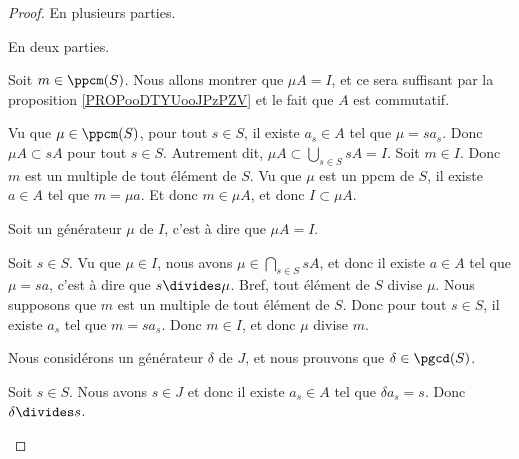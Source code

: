 \begin{proof}
	En plusieurs parties.
	\begin{subproof}
		En deux parties.
		\begin{subproof}
			\spitem[\( \Rightarrow\)]
			Soit \( m\in \ppcm(S)\). Nous allons montrer que \( \mu A=I\), et ce sera suffisant par la proposition \ref{PROPooDTYUooJPzPZV} et le fait que \( A\) est commutatif.
			\begin{subproof}
				\spitem[\( \mu A\subset I\)]
				Vu que \( \mu\in \ppcm(S)\), pour tout \( s\in S\), il existe \( a_s\in A\) tel que \( \mu=s a_s\). Donc \( \mu A\subset sA\) pour tout \( s\in S\). Autrement dit, \( \mu A\subset \bigcup_{s\in S}sA=I\).
				\spitem[\( I\subset \mu A\)]
				Soit \( m\in I\). Donc \( m\) est un multiple de tout élément de \( S\). Vu que \( \mu\) est un ppcm de \( S\), il existe \( a\in A\) tel que \( m=\mu a\). Et donc \( m\in \mu A\), et donc \( I\subset \mu A\).
			\end{subproof}
			\spitem[\( \Leftarrow\)]
			Soit un générateur \( \mu\) de \( I\), c'est à dire que \( \mu A=I\).
			\begin{subproof}
				\spitem[\( S\divides \mu\).]
				Soit \( s\in S\). Vu que \( \mu\in I\), nous avons \( \mu\in\bigcap_{s\in S}sA\), et donc il existe \( a\in A\) tel que \( \mu =sa\), c'est à dire que \( s\divides \mu\). Bref, tout élément de \( S\) divise \( \mu\).
				\spitem[Si \( S\divides m\), alors \( \mu\divides m\)]
				Nous supposons que \( m\)  est un multiple de tout élément de \( S\). Donc pour tout \( s\in S\), il existe \( a_s\) tel que \( m=sa_s\). Donc \( m\in I\), et donc \( \mu\) divise \( m\).
			\end{subproof}
		\end{subproof}
		\spitem[Pour \ref{ITEMooZUCVooRIpnhU}]
		Nous considérons un générateur \( \delta\) de \( J\), et nous prouvons que \( \delta\in\pgcd(S)\).
		\begin{subproof}
			\spitem[\( \delta\) divise \( S\)]
			Soit \( s\in S\). Nous avons \( s\in J\) et donc il existe \( a_s\in A\) tel que \( \delta a_s=s\). Donc \( \delta\divides s\).


\end{subproof}
\end{subproof}
\end{proof}
